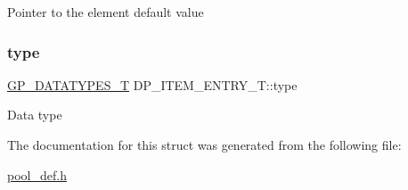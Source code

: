 Pointer to the element default value \mbox{\label{structDP__ITEM__ENTRY__T_a56ac58b2ffeabb229c2741eb133d3ad9}} 
\subsubsection{\texorpdfstring{type}{type}}
{\footnotesize\ttfamily \mbox{\hyperlink{gp__types_8h_acd9c75cdf141e6e507d4802cece61205}{G\+P\+\_\+\+D\+A\+T\+A\+T\+Y\+P\+E\+S\+\_\+T}} D\+P\+\_\+\+I\+T\+E\+M\+\_\+\+E\+N\+T\+R\+Y\+\_\+\+T\+::type}

Data type 

The documentation for this struct was generated from the following file\+:\begin{DoxyCompactItemize}
\item 
\mbox{\hyperlink{pool__def_8h}{pool\+\_\+def.\+h}}\end{DoxyCompactItemize}
